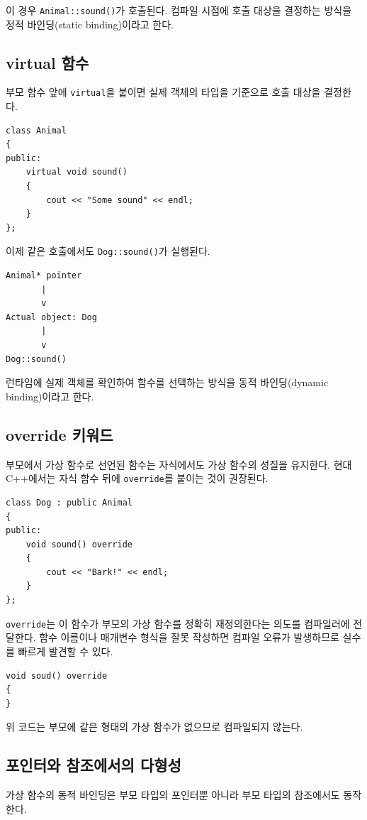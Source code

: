 \documentclass[11pt,a4paper]{article}
\begin{document}
이 경우 \texttt{Animal::sound()}가 호출된다. 컴파일 시점에 호출 대상을 결정하는 방식을 정적 바인딩(static binding)이라고 한다.

\subsection{virtual 함수}
부모 함수 앞에 \texttt{virtual}을 붙이면 실제 객체의 타입을 기준으로 호출 대상을 결정한다.

\begin{lstlisting}
class Animal
{
public:
    virtual void sound()
    {
        cout << "Some sound" << endl;
    }
};
\end{lstlisting}

이제 같은 호출에서도 \texttt{Dog::sound()}가 실행된다.

\begin{verbatim}
Animal* pointer
       |
       v
Actual object: Dog
       |
       v
Dog::sound()
\end{verbatim}

런타임에 실제 객체를 확인하여 함수를 선택하는 방식을 동적 바인딩(dynamic binding)이라고 한다.

\subsection{override 키워드}
부모에서 가상 함수로 선언된 함수는 자식에서도 가상 함수의 성질을 유지한다. 현대 C++에서는 자식 함수 뒤에 \texttt{override}를 붙이는 것이 권장된다.

\begin{lstlisting}
class Dog : public Animal
{
public:
    void sound() override
    {
        cout << "Bark!" << endl;
    }
};
\end{lstlisting}

\texttt{override}는 이 함수가 부모의 가상 함수를 정확히 재정의한다는 의도를 컴파일러에 전달한다. 함수 이름이나 매개변수 형식을 잘못 작성하면 컴파일 오류가 발생하므로 실수를 빠르게 발견할 수 있다.

\begin{lstlisting}
void soud() override
{
}
\end{lstlisting}

위 코드는 부모에 같은 형태의 가상 함수가 없으므로 컴파일되지 않는다.

\subsection{포인터와 참조에서의 다형성}
가상 함수의 동적 바인딩은 부모 타입의 포인터뿐 아니라 부모 타입의 참조에서도 동작한다.
\end{document}
